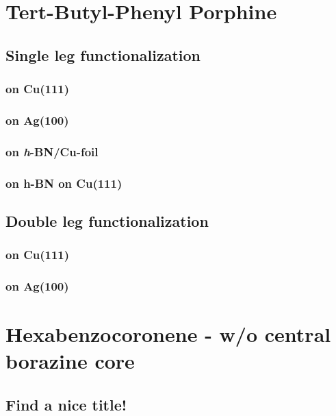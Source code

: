 \documentclass[
10pt,					%
a4paper,				%
twoside,				%
BCOR=8mm,				%
headings=normal,		%
headsepline,			%
footsepline,			%
plainfootsepline,		%
]{scrbook}
\begin{document}
\chapter{Tert-Butyl-Phenyl Porphine}
  \section{Single leg functionalization}
    
   \subsection{on Cu(111)}
      
   \subsection{on Ag(100)}
      
   \subsection{on \textit{h}-BN/Cu-foil}
      
   \subsection{on h-BN on Cu(111)}
      
  \section{Double leg functionalization}
   \subsection{on Cu(111)}
      
   \subsection{on Ag(100)}
      
\chapter{Hexabenzocoronene - w/o central borazine core}
	\section{Find a nice title!}
		
\end{document}
